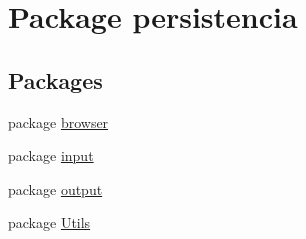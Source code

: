 \hypertarget{namespacepersistencia}{}\section{Package persistencia}
\label{namespacepersistencia}
\subsection*{Packages}
\begin{DoxyCompactItemize}
\item 
package \hyperlink{namespacepersistencia_1_1browser}{browser}
\item 
package \hyperlink{namespacepersistencia_1_1input}{input}
\item 
package \hyperlink{namespacepersistencia_1_1output}{output}
\item 
package \hyperlink{namespacepersistencia_1_1Utils}{Utils}
\end{DoxyCompactItemize}
